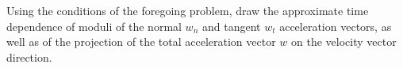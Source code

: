 
\item Using the conditions of the foregoing problem, draw the approximate time dependence of moduli of the normal \( w_n \) and tangent \( w_t \) acceleration vectors, as well as of the projection of the total acceleration vector \( w \) on the velocity vector direction.
